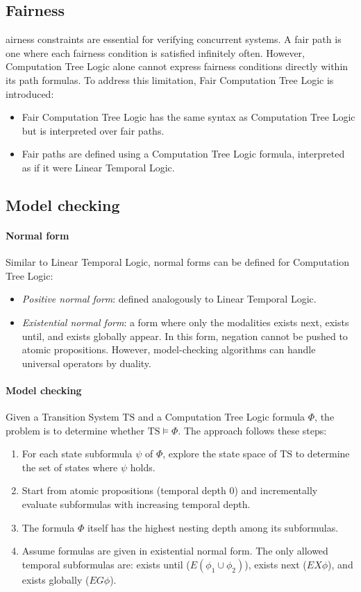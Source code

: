 \subsection{Fairness}
airness constraints are essential for verifying concurrent systems. 
A fair path is one where each fairness condition is satisfied infinitely often. 
However, Computation Tree Logic alone cannot express fairness conditions directly within its path formulas.
To address this limitation, Fair Computation Tree Logic is introduced:
\begin{itemize}
    \item Fair Computation Tree Logic has the same syntax as Computation Tree Logic but is interpreted over fair paths.
    \item Fair paths are defined using a Computation Tree Logic formula, interpreted as if it were Linear Temporal Logic.
\end{itemize}

\subsection{Model checking}
\paragraph*{Normal form}
Similar to Linear Temporal Logic, normal forms can be defined for Computation Tree Logic:
\begin{itemize}
    \item \textit{Positive normal form}: defined analogously to Linear Temporal Logic.
    \item \textit{Existential normal form}: a form where only the modalities exists next, exists until, and exists globally appear.
        In this form, negation cannot be pushed to atomic propositions.
        However, model-checking algorithms can handle universal operators by duality. 
\end{itemize}

\paragraph*{Model checking}
Given a Transition System $\text{TS}$ and a Computation Tree Logic formula $\Phi$, the problem is to determine whether $\text{TS} \models \Phi$. 
The approach follows these steps:
\begin{enumerate}
    \item For each state subformula $\psi$ of $\Phi$, explore the state space of $\text{TS}$ to determine the set of states where $\psi$ holds.
    \item Start from atomic propositions (temporal depth 0) and incrementally evaluate subformulas with increasing temporal depth.
    \item The formula $\Phi$ itself has the highest nesting depth among its subformulas.
    \item Assume formulas are given in existential normal form. 
        The only allowed temporal subformulas are: exists until ($E(\phi_1\cup\phi_2)$), exists next ($EX\phi$), and exists globally ($EG\phi$).
\end{enumerate}


